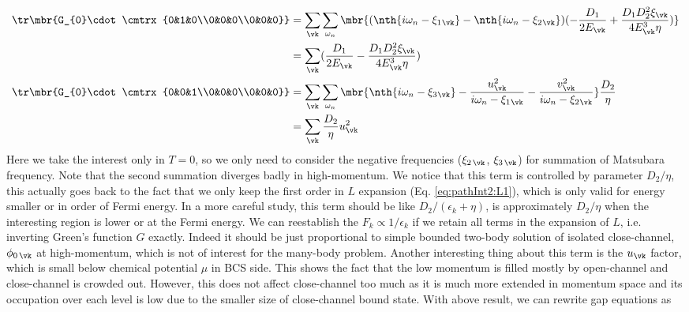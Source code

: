  \begin{align}
\tr\mbr{G_{0}\cdot\cmtrx{0&1&0\\0&0&0\\0&0&0}}&=
\sum_{\vk}\sum_{\omega_{n}}
	\mbr{(\nth{i\omega_{n}-\xi_{1}{}_{\vk}}-\nth{i\omega_{n}-\xi_{2}{_{\vk}}})
	(-\frac{D_{1}}{2E_{\vk}}+\frac{D_{1}D_{2}^{2}\xi_\vk}{4E_{\vk}^{3}\eta})}\\
	&=\sum_{\vk}(\frac{D_{1}}{2E_{\vk}}-\frac{D_{1}D_{2}^{2}\xi_\vk}{4E_{\vk}^{3}\eta})\\
\tr\mbr{G_{0}\cdot\cmtrx{0&0&1\\0&0&0\\0&0&0}}&=
\sum_{\vk}\sum_{\omega_{n}}
\mbr{\nth{i\omega_{n}-\xi_{3}{}_{\vk}}-
\frac{u_{\vk}^{2}}{i\omega_{n}-\xi_{1}{}_{\vk}}-\frac{v_{\vk}^{2}}{i\omega_{n}-\xi_{2}{}_{\vk}}}\frac{D_{2}}{\eta}\label{eq:pathInt2:F20}\\
&=\sum_{\vk}\frac{D_{2}}{\eta}u_{\vk}^2
  \end{align}
Here we take the interest only in $T=0$, so we only need to consider the negative frequencies ($\xi_{2\,\vk}$, $\xi_{3\,\vk}$) for summation of Matsubara frequency. Note that the second summation diverges badly in high-momentum. %
We notice that this term is controlled by parameter $D_{2}/\eta$, this actually goes back to the fact that we only keep the first order in $L$ expansion (Eq. \eqref{eq:pathInt2:L1}), which is only valid for energy smaller or in order of Fermi energy.  In a more careful study, this term should be like $D_{2}/(\epsilon_{k}+\eta)$, is approximately $D_{2}/\eta$ when the interesting region  is lower or at the Fermi energy.   We can reestablish the $F_{k}\propto1/\epsilon_{k}$ if we retain all terms in the expansion of $L$, i.e. inverting Green's function $G$ exactly.       Indeed it should be just proportional to simple bounded two-body solution of isolated close-channel, $\phi_{0\,\vk}$ at high-momentum, which is not of interest for the many-body problem. 
 Another interesting thing about this term is the $u_\vk$ factor, which is small below chemical potential $\mu$ in BCS side.  This shows the fact that the low momentum is filled mostly by open-channel and close-channel is crowded out.  However, this does not affect close-channel too much as it is much more extended in momentum space and its occupation over each level is low due to the smaller size of close-channel bound state.  With above result, we can rewrite gap equations as 

